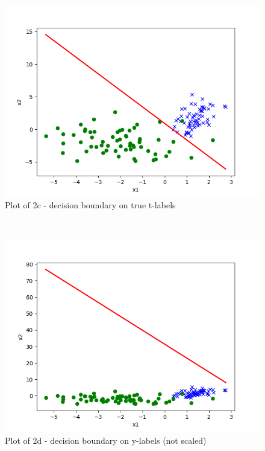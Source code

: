 \begin{answer}\\
\begin{figure}
  \includegraphics[width=\linewidth]{../src/output/p02c_pred_test.png}
  \caption{Plot of 2c - decision boundary on true t-labels}
  \label{fig:Plot of 2c - decision boundary on true t-labels}
\end{figure}\\
\begin{figure}
  \includegraphics[width=\linewidth]{../src/output/p02d_pred_test.png}
  \caption{Plot of 2d - decision boundary on y-labels (not scaled)}
  \label{fig:Plot of 2d - decision boundary on y-labels (not scaled)}
\end{figure}\\

\end{answer}
